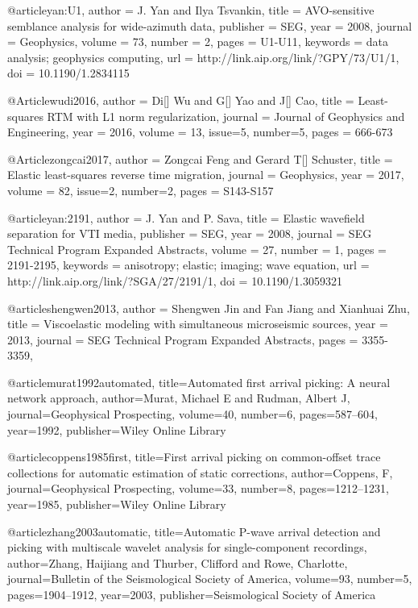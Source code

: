 @article{yan:U1,
  author =	 {J. Yan and Ilya Tsvankin},
  title =	 {AVO-sensitive semblance analysis for wide-azimuth
                  data},
  publisher =	 {SEG},
  year =	 2008,
  journal =	 {Geophysics},
  volume =	 73,
  number =	 2,
  pages =	 {U1-U11},
  keywords =	 {data analysis; geophysics computing},
  url =		 {http://link.aip.org/link/?GPY/73/U1/1},
  doi =		 {10.1190/1.2834115}
}



@Article{wudi2016,
  author = 	 {Di[] Wu and G[] Yao and J[] Cao},
  title = 	 {Least-squares RTM with {L}1 norm regularization},
  journal = 	 {Journal of Geophysics and Engineering},
  year = 	 2016,
  volume = 	 13,
  issue=5,
  number=5,
  pages = 	 {666-673}}
  

@Article{zongcai2017,
  author = 	 {Zongcai Feng and Gerard T[] Schuster},
  title = 	 {Elastic least-squares reverse time migration},
  journal = 	 {Geophysics},
  year = 	 2017,
  volume = 	 82,
  issue=2,
  number=2,
  pages = 	 {S143-S157}}
  
@article{yan:2191,
  author =	 {J. Yan and P. Sava},
  title =	 {Elastic wavefield separation for {VTI} media},
  publisher =	 {SEG},
  year =	 2008,
  journal =	 {SEG Technical Program Expanded Abstracts},
  volume =	 27,
  number =	 1,
  pages =	 {2191-2195},
  keywords =	 {anisotropy; elastic; imaging; wave equation},
  url =		 {http://link.aip.org/link/?SGA/27/2191/1},
  doi =		 {10.1190/1.3059321}
}


@article{shengwen2013,
  author =	 {Shengwen Jin and Fan Jiang and Xianhuai Zhu},
  title =	 {Viscoelastic modeling with simultaneous microseismic sources},
  year =	 2013,
  journal =	 {SEG Technical Program Expanded Abstracts},
  pages =	 {3355-3359},
}

@article{murat1992automated,
  title={Automated first arrival picking: A neural network approach},
  author={Murat, Michael E and Rudman, Albert J},
  journal={Geophysical Prospecting},
  volume={40},
  number={6},
  pages={587--604},
  year={1992},
  publisher={Wiley Online Library}
}

@article{coppens1985first,
  title={First arrival picking on common-offset trace collections for automatic estimation of static corrections},
  author={Coppens, F},
  journal={Geophysical Prospecting},
  volume={33},
  number={8},
  pages={1212--1231},
  year={1985},
  publisher={Wiley Online Library}
}

@article{zhang2003automatic,
  title={Automatic P-wave arrival detection and picking with multiscale wavelet analysis for single-component recordings},
  author={Zhang, Haijiang and Thurber, Clifford and Rowe, Charlotte},
  journal={Bulletin of the Seismological Society of America},
  volume={93},
  number={5},
  pages={1904--1912},
  year={2003},
  publisher={Seismological Society of America}
}


